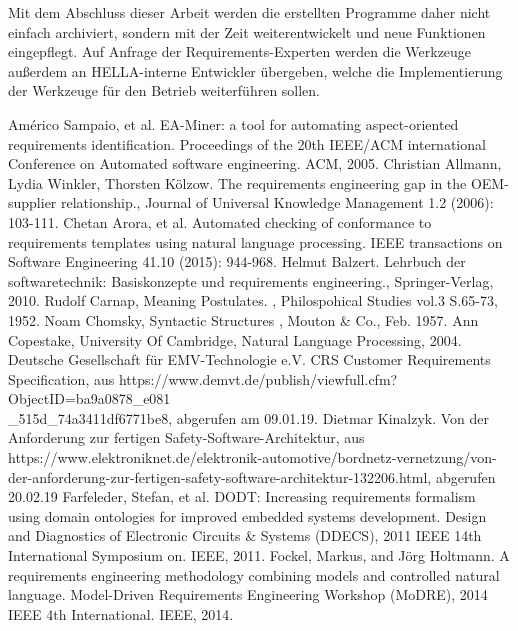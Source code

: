 \documentclass[12pt]{report}
\begin{document}
Mit dem Abschluss dieser Arbeit werden die erstellten Programme daher nicht einfach archiviert, sondern mit der Zeit weiterentwickelt und neue Funktionen eingepflegt.
Auf Anfrage der Requirements-Experten werden die Werkzeuge außerdem an HELLA-interne Entwickler übergeben, welche die Implementierung der Werkzeuge für den Betrieb weiterführen sollen. 

\newpage
\begin{thebibliography}{20}
Américo Sampaio, et al. \glqq EA-Miner: a tool for automating aspect-oriented requirements identification.\grqq{} Proceedings of the 20th IEEE/ACM international Conference on Automated software engineering. ACM, 2005.
 Christian Allmann, Lydia Winkler, Thorsten Kölzow. \glqq The requirements engineering gap in the OEM-supplier relationship.\grqq , Journal of Universal Knowledge Management 1.2 (2006): 103-111.
Chetan Arora, et al. \glqq Automated checking of conformance to requirements templates using natural language processing.\grqq{} IEEE transactions on Software Engineering 41.10 (2015): 944-968.
Helmut Balzert. \glqq Lehrbuch der softwaretechnik: Basiskonzepte und requirements engineering.\grqq , Springer-Verlag, 2010.
Rudolf Carnap, \glqq  Meaning Postulates.\grqq{} , Philospohical Studies vol.3 S.65-73, 1952.
 Noam Chomsky, \glqq  Syntactic Structures\grqq{} , Mouton \& Co., Feb. 1957.
Ann Copestake, University Of Cambridge, \glqq Natural Language Processing\grqq , 2004.
 Deutsche Gesellschaft für EMV-Technologie e.V. \glqq CRS Customer Requirements Specification\grqq, aus https://www.demvt.de/publish/viewfull.cfm?ObjectID=ba9a0878\_e081\\ \_515d\_74a3411df6771be8, abgerufen am 09.01.19.
 Dietmar Kinalzyk. \glqq Von der Anforderung zur fertigen Safety-Software-Architektur\grqq{}, aus https://www.elektroniknet.de/elektronik-automotive/bordnetz-vernetzung/von-der-anforderung-zur-fertigen-safety-software-architektur-132206.html, abgerufen 20.02.19
 Farfeleder, Stefan, et al. \glqq DODT: Increasing requirements formalism using domain ontologies for improved embedded systems development. \grqq{} Design and Diagnostics of Electronic Circuits \& Systems (DDECS), 2011 IEEE 14th International Symposium on. IEEE, 2011.
 Fockel, Markus, and Jörg Holtmann. \glqq A requirements engineering methodology combining models and controlled natural language.\grqq{} Model-Driven Requirements Engineering Workshop (MoDRE), 2014 IEEE 4th International. IEEE, 2014.

\end{thebibliography}
\end{document}
